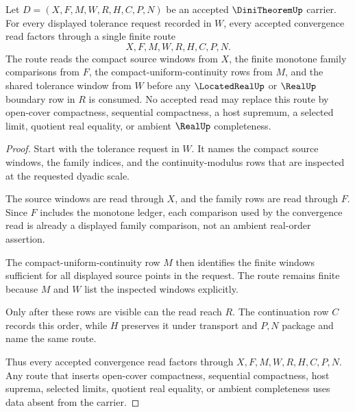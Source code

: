 \begin{theorem}\label{thm:dini-theorem-monotone-uniform-window}
Let $D=(X,F,M,W,R,H,C,P,N)$ be an accepted $\DiniTheoremUp$ carrier. For every displayed tolerance request recorded in $W$, every accepted convergence read factors through a single finite route
$$
X,F,M,W,R,H,C,P,N .
$$
The route reads the compact source windows from $X$, the finite monotone family comparisons from $F$, the compact-uniform-continuity rows from $M$, and the shared tolerance window from $W$ before any $\LocatedRealUp$ or $\RealUp$ boundary row in $R$ is consumed. No accepted read may replace this route by open-cover compactness, sequential compactness, a host supremum, a selected limit, quotient real equality, or ambient $\RealUp$ completeness.
\end{theorem}
\begin{proof}
Start with the tolerance request in $W$. It names the compact source windows, the family indices, and the continuity-modulus rows that are inspected at the requested dyadic scale.

The source windows are read through $X$, and the family rows are read through $F$. Since $F$ includes the monotone ledger, each comparison used by the convergence read is already a displayed family comparison, not an ambient real-order assertion.

The compact-uniform-continuity row $M$ then identifies the finite windows sufficient for all displayed source points in the request. The route remains finite because $M$ and $W$ list the inspected windows explicitly.

Only after these rows are visible can the read reach $R$. The continuation row $C$ records this order, while $H$ preserves it under transport and $P,N$ package and name the same route.

Thus every accepted convergence read factors through $X,F,M,W,R,H,C,P,N$. Any route that inserts open-cover compactness, sequential compactness, host suprema, selected limits, quotient real equality, or ambient completeness uses data absent from the carrier.
\end{proof}

